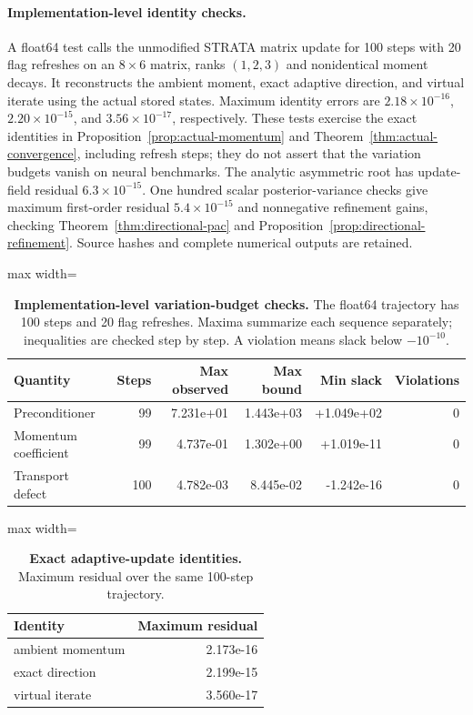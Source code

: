 \paragraph{Implementation-level identity checks.}
A float64 test calls the unmodified STRATA matrix update for 100 steps with 20 flag refreshes on an $8\times6$ matrix, ranks $(1,2,3)$ and nonidentical moment decays. It reconstructs the ambient moment, exact adaptive direction, and virtual iterate using the actual stored states. Maximum identity errors are $2.18\times10^{-16}$, $2.20\times10^{-15}$, and $3.56\times10^{-17}$, respectively. These tests exercise the exact identities in Proposition~\ref{prop:actual-momentum} and Theorem~\ref{thm:actual-convergence}, including refresh steps; they do not assert that the variation budgets vanish on neural benchmarks. The analytic asymmetric root has update-field residual $6.3\times10^{-15}$. One hundred scalar posterior-variance checks give maximum first-order residual $5.4\times10^{-15}$ and nonnegative refinement gains, checking Theorem~\ref{thm:directional-pac} and Proposition~\ref{prop:directional-refinement}. Source hashes and complete numerical outputs are retained.
\begin{table}[htbp]
\centering
\caption{\textbf{Implementation-level variation-budget checks.} The float64 trajectory has 100 steps and 20 flag refreshes. Maxima summarize each sequence separately; inequalities are checked step by step. A violation means slack below $-10^{-10}$.}
\label{tab:actual-state-budgets}
\begin{adjustbox}{max width=\linewidth}
\begin{tabular}{lrrrrr}
\toprule
Quantity & Steps & Max observed & Max bound & Min slack & Violations \\
\midrule
Preconditioner & 99 & 7.231e+01 & 1.443e+03 & +1.049e+02 & 0 \\
Momentum coefficient & 99 & 4.737e-01 & 1.302e+00 & +1.019e-11 & 0 \\
Transport defect & 100 & 4.782e-03 & 8.445e-02 & -1.242e-16 & 0 \\
\bottomrule
\end{tabular}
\end{adjustbox}
\end{table}
\begin{table}[htbp]
\centering
\caption{\textbf{Exact adaptive-update identities.} Maximum residual over the same 100-step trajectory.}
\label{tab:actual-identities}
\begin{adjustbox}{max width=\linewidth}
\begin{tabular}{lr}
\toprule
Identity & Maximum residual \\
\midrule
ambient momentum & 2.173e-16 \\
exact direction & 2.199e-15 \\
virtual iterate & 3.560e-17 \\
\bottomrule
\end{tabular}
\end{adjustbox}
\end{table}

